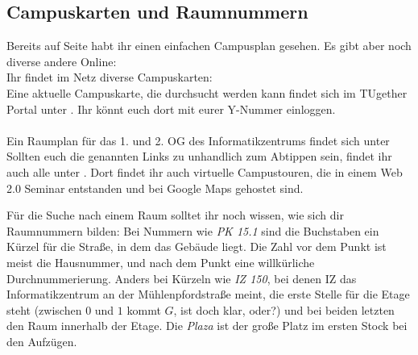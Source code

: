 \subsection{Campuskarten und Raumnummern}
\label{campuskarte}
\ifpdf %
Bereits auf Seite \pageref{plan} habt ihr einen einfachen Campusplan
gesehen. Es gibt aber noch diverse andere Online:\\
\else
Ihr findet im Netz diverse Campuskarten:\\
\fi
Eine aktuelle Campuskarte, die durchsucht werden kann findet sich im
TUgether Portal unter . Ihr
könnt euch dort mit eurer Y-Nummer einloggen.\\\\

Ein Raumplan für das 1. und 2. OG des Informatikzentrums findet sich
unter\\ 
Sollten euch die genannten Links zu unhandlich zum Abtippen sein, findet ihr
auch alle unter
.
Dort findet ihr auch virtuelle Campustouren, die  in einem Web 2.0 Seminar entstanden und
bei Google Maps gehostet sind.

Für die Suche nach einem Raum solltet ihr noch wissen, wie sich dir Raumnummern bilden: Bei Nummern wie \textit{PK 15.1} sind die Buchstaben ein Kürzel für die Straße, in dem das Gebäude liegt. Die Zahl vor dem Punkt ist meist die Hausnummer, und nach dem Punkt eine willkürliche Durchnummerierung. Anders bei Kürzeln wie \textit{IZ 150}, bei denen IZ das Informatikzentrum an der Mühlenpfordstraße meint, die erste Stelle für die Etage steht (zwischen $0$ und $1$ kommt $G$, ist doch klar, oder?) und bei beiden letzten den Raum innerhalb der Etage. Die \textit{Plaza} ist der große Platz im ersten Stock bei den Aufzügen.

